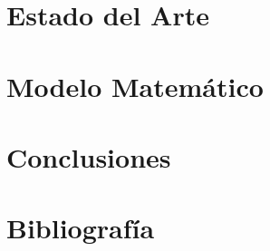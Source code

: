 \documentclass[letter, 10pt]{article}
\begin{document}
\section{Estado del Arte}


\section{Modelo Matemático}


\section{Conclusiones}


\section{Bibliografía}



\end{document}
